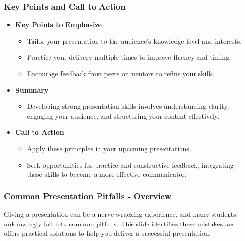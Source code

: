 \documentclass[aspectratio=169]{beamer}
\begin{document}
\begin{frame}[fragile]
    \frametitle{Key Points and Call to Action}
    \begin{itemize}
        \item \textbf{Key Points to Emphasize}
            \begin{itemize}
                \item Tailor your presentation to the audience's knowledge level and interests.
                \item Practice your delivery multiple times to improve fluency and timing.
                \item Encourage feedback from peers or mentors to refine your skills.
            \end{itemize}
        
        \item \textbf{Summary}
            \begin{itemize}
                \item Developing strong presentation skills involves understanding clarity, engaging your audience, and structuring your content effectively.
            \end{itemize}
    
        \item \textbf{Call to Action}
            \begin{itemize}
                \item Apply these principles in your upcoming presentations.
                \item Seek opportunities for practice and constructive feedback, integrating these skills to become a more effective communicator.
            \end{itemize}
    \end{itemize}
\end{frame}

\begin{frame}[fragile]
    \frametitle{Common Presentation Pitfalls - Overview}
    Giving a presentation can be a nerve-wracking experience, and many students unknowingly fall into common pitfalls. 
    This slide identifies these mistakes and offers practical solutions to help you deliver a successful presentation.
\end{frame}
\end{document}
